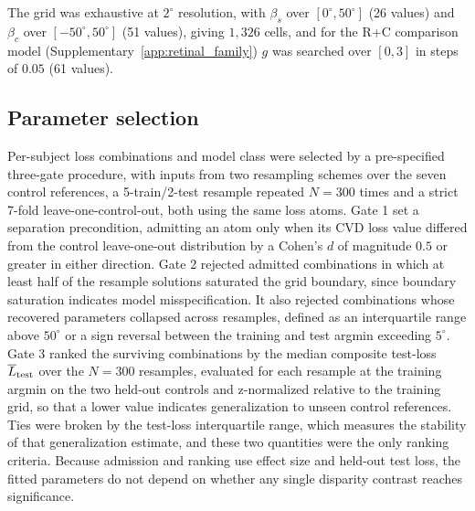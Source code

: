 The grid was exhaustive at $2^\circ$ resolution, with $\beta_s$ over $[0^\circ, 50^\circ]$ (26 values) and $\beta_c$ over $[-50^\circ, 50^\circ]$ (51 values), giving $1{,}326$ cells, and for the R+C comparison model (Supplementary~\cref{app:retinal_family}) $g$ was searched over $[0, 3]$ in steps of $0.05$ (61 values).

\subsection{Parameter selection}
\label{sec:methods:selection}

Per-subject loss combinations and model class were selected by a pre-specified three-gate procedure, with inputs from two resampling schemes over the seven control references, a 5-train/2-test resample repeated $N = 300$ times and a strict 7-fold leave-one-control-out, both using the same loss atoms. Gate 1 set a separation precondition, admitting an atom only when its CVD loss value differed from the control leave-one-out distribution by a Cohen's $d$ of magnitude $0.5$ or greater in either direction. Gate 2 rejected admitted combinations in which at least half of the resample solutions saturated the grid boundary, since boundary saturation indicates model misspecification. It also rejected combinations whose recovered parameters collapsed across resamples, defined as an interquartile range above $50^\circ$ or a sign reversal between the training and test argmin exceeding $5^\circ$. Gate 3 ranked the surviving combinations by the median composite test-loss $\overline{L}_{\rm test}$ over the $N = 300$ resamples, evaluated for each resample at the training argmin on the two held-out controls and z-normalized relative to the training grid, so that a lower value indicates generalization to unseen control references. Ties were broken by the test-loss interquartile range, which measures the stability of that generalization estimate, and these two quantities were the only ranking criteria. Because admission and ranking use effect size and held-out test loss, the fitted parameters do not depend on whether any single disparity contrast reaches significance.

